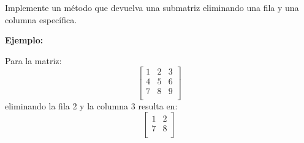 Implemente un método que devuelva una submatriz eliminando una fila y una columna específica.

\textbf{Ejemplo:}

Para la matriz:
\[
\begin{bmatrix}
1 & 2 & 3 \\
4 & 5 & 6 \\
7 & 8 & 9 \\
\end{bmatrix}
\]
eliminando la fila 2 y la columna 3 resulta en:
\[
\begin{bmatrix}
1 & 2 \\
7 & 8 \\
\end{bmatrix}
\]